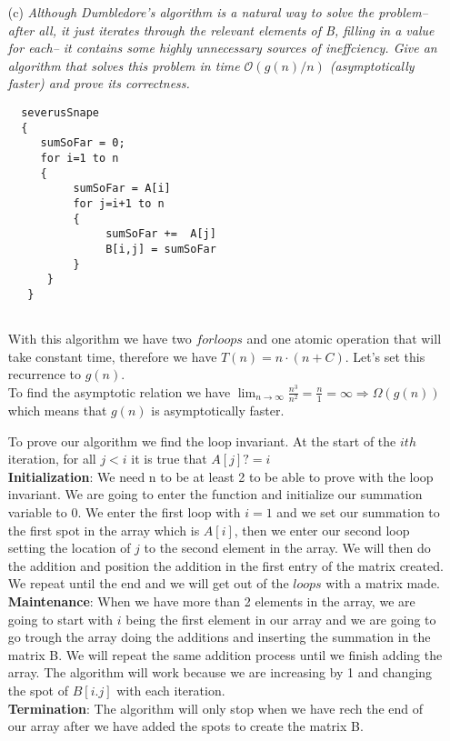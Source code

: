 \documentclass[12pt]{article} \setlength{\oddsidemargin}{0in}
\begin{document}
{\begin{enumerate}
For the worst case scenario we assume we have an array with $n >1$. Therefore we go through the first loop at most  $n$ times. Then the second for loop we also go at most $n$ times. Then we have the summation that has to go also at most $n$ times. The other operation takes a constant time. After we have the times we go through each we can see that we have a recurrence of the form:\\ $T(n) = n \cdot n \cdot n + c $ which is $\mathbf{O(n^3)}$.
  
\item[(c)]{\textit{Although Dumbledore's algorithm is a natural way to solve		%
    the problem--after all, it just iterates through the relevant	
    elements of B, filling in a value for each-- it contains some
    highly unnecessary sources of ineffciency. Give an algorithm that
    solves this problem in time $\mathcal{O}(g(n)/n)$ (asymptotically
    faster) and prove its correctness.}}
  \\
 \begin{verbatim} 
  severusSnape 
  {
     sumSoFar = 0; 
     for i=1 to n 
     { 
          sumSoFar = A[i] 
          for j=i+1 to n 
          {
               sumSoFar +=  A[j] 
               B[i,j] = sumSoFar 
          }
      }
   }
  
\end{verbatim} 

With this algorithm we have two $for loops$ and one atomic operation that will take constant time, therefore we have $T(n) = n \cdot (n +C)$. Let's set this recurrence to $g(n)$. \\To find the asymptotic relation we have $\displaystyle \lim_{n\to \infty} \displaystyle \frac{n^3}{n^2} = \frac{n}{1} = \infty \Rightarrow \Omega(g(n))$ which means that $g(n)$ is asymptotically faster.

To prove our algorithm we find the loop invariant. At the start of the $ith$ iteration, for all $j < i$ it is true that $A[j]?= i$ \\
\textbf{Initialization}: We need n to be at least 2 to be able to prove with the loop invariant. We are going to enter the function and initialize our summation variable to 0. We enter the first loop with $i=1$ and we set our summation to the first spot in the array which is $A[i]$, then we enter our second loop setting the location of $j$ to the second element in the array. We will then do the addition and position the addition in the first entry of the matrix created. We repeat until the end and we will get out of the $loops$ with a matrix made. \\
\textbf{Maintenance}: When we have more than 2 elements in the array, we are going to start with $i$ being the first element in our array and we are going to go trough the array doing the additions and inserting the summation in the matrix B. We will repeat the same addition process until we finish adding the array. The algorithm will work because we are increasing by 1 and changing the spot of $B[i.j]$ with each iteration. \\
\textbf{Termination}: The algorithm will only stop when we have rech the end of our array after we have added the spots to create the matrix B. 


\end{enumerate}}
\end{document}
